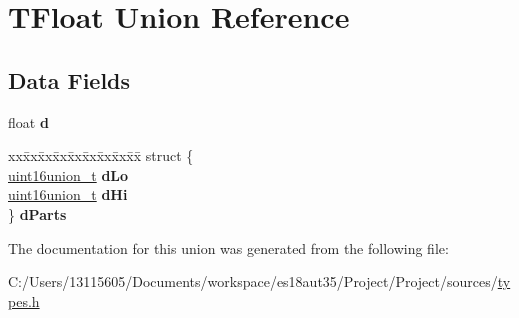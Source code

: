 \hypertarget{union_t_float}{}\section{T\+Float Union Reference}
\label{union_t_float}
\subsection*{Data Fields}
\begin{DoxyCompactItemize}
\item 
\hypertarget{union_t_float_a5261069e995f7e1b2b3b7580c954996b}{}float {\bfseries d}\label{union_t_float_a5261069e995f7e1b2b3b7580c954996b}

\item 
\hypertarget{union_t_float_ae1eaef4719ce541fef065e6ccded1a4b}{}\begin{tabbing}
xx\=xx\=xx\=xx\=xx\=xx\=xx\=xx\=xx\=\kill
struct \{\\
\>\hyperlink{unionuint16union__t}{uint16union\_t} {\bfseries dLo}\\
\>\hyperlink{unionuint16union__t}{uint16union\_t} {\bfseries dHi}\\
\} {\bfseries dParts}\label{union_t_float_ae1eaef4719ce541fef065e6ccded1a4b}
\\

\end{tabbing}\end{DoxyCompactItemize}


The documentation for this union was generated from the following file\+:\begin{DoxyCompactItemize}
\item 
C\+:/\+Users/13115605/\+Documents/workspace/es18aut35/\+Project/\+Project/sources/\hyperlink{types_8h}{types.\+h}\end{DoxyCompactItemize}
